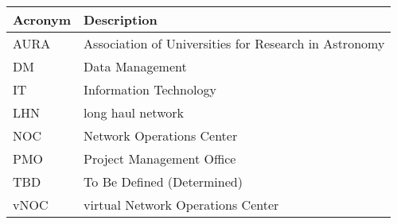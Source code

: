 \addtocounter{table}{-1}
\begin{longtable}{p{}p{}}\hline
\textbf{Acronym} & \textbf{Description}  \\\hline

AURA & Association of Universities for Research in Astronomy \\\hline
DM & Data Management \\\hline
IT & Information Technology \\\hline
LHN & long haul network \\\hline
NOC & Network Operations Center \\\hline
PMO & Project Management Office \\\hline
TBD & To Be Defined (Determined) \\\hline
vNOC & virtual Network Operations Center \\\hline
\end{longtable}
